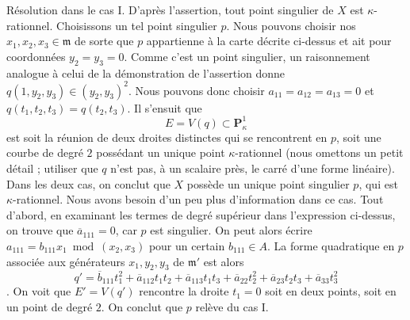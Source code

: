 \medskip\noindent Résolution dans le cas I. D'après l'assertion, tout point singulier de $X$ est $\kappa$-rationnel. Choisissons un tel point singulier $p$. Nous pouvons choisir nos $x_1, x_2, x_3 \in \mathfrak m$ de sorte que $p$ appartienne à la carte décrite ci-dessus et ait pour coordonnées $y_2 = y_3 = 0$. Comme c'est un point singulier, un raisonnement analogue à celui de la démonstration de l'assertion donne $q(1, y_2, y_3) \in (y_2, y_3)^2$. Nous pouvons donc choisir $a_{11} = a_{12} = a_{13} = 0$ et $q(t_1, t_2, t_3) = q(t_2, t_3)$. Il s'ensuit que $$
E = V(q) \subset \mathbf{P}^1_\kappa
$$ est soit la réunion de deux droites distinctes qui se rencontrent en $p$, soit une courbe de degré $2$ possédant un unique point $\kappa$-rationnel (nous omettons un petit détail ; utiliser que $q$ n'est pas, à un scalaire près, le carré d'une forme linéaire). Dans les deux cas, on conclut que $X$ possède un unique point singulier $p$, qui est $\kappa$-rationnel. Nous avons besoin d'un peu plus d'information dans ce cas. Tout d'abord, en examinant les termes de degré supérieur dans l'expression ci-dessus, on trouve que $\overline{a}_{111} = 0$, car $p$ est singulier. On peut alors écrire $a_{111} = b_{111} x_1 \bmod (x_2, x_3)$ pour un certain $b_{111} \in A$. La forme quadratique en $p$ associée aux générateurs $x_1, y_2, y_3$ de $\mathfrak m'$ est alors $$
q' =
\overline{b}_{111} t_1^2 +
\overline{a}_{112} t_1 t_2 + \overline{a}_{113} t_1 t_3 +
\overline{a}_{22} t_2^2 +
\overline{a}_{23} t_2 t_3 +
\overline{a}_{33} t_3^2
$$. On voit que $E' = V(q')$ rencontre la droite $t_1 = 0$ soit en deux points, soit en un point de degré $2$. On conclut que $p$ relève du cas I.

